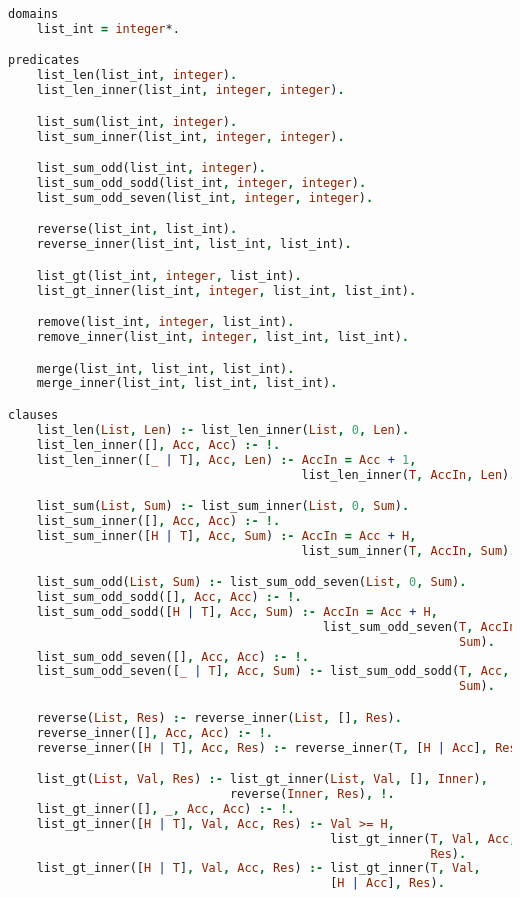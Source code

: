 \begin{lstlisting}[language=Prolog]
domains
    list_int = integer*.

predicates
    list_len(list_int, integer).
    list_len_inner(list_int, integer, integer).

    list_sum(list_int, integer).
    list_sum_inner(list_int, integer, integer).

    list_sum_odd(list_int, integer).
    list_sum_odd_sodd(list_int, integer, integer).
    list_sum_odd_seven(list_int, integer, integer).

    reverse(list_int, list_int).
    reverse_inner(list_int, list_int, list_int).

    list_gt(list_int, integer, list_int).
    list_gt_inner(list_int, integer, list_int, list_int).

    remove(list_int, integer, list_int).
    remove_inner(list_int, integer, list_int, list_int).

    merge(list_int, list_int, list_int).
    merge_inner(list_int, list_int, list_int).

clauses
    list_len(List, Len) :- list_len_inner(List, 0, Len).
    list_len_inner([], Acc, Acc) :- !.
    list_len_inner([_ | T], Acc, Len) :- AccIn = Acc + 1,
                                         list_len_inner(T, AccIn, Len).

    list_sum(List, Sum) :- list_sum_inner(List, 0, Sum).
    list_sum_inner([], Acc, Acc) :- !.
    list_sum_inner([H | T], Acc, Sum) :- AccIn = Acc + H,
                                         list_sum_inner(T, AccIn, Sum).

    list_sum_odd(List, Sum) :- list_sum_odd_seven(List, 0, Sum).
    list_sum_odd_sodd([], Acc, Acc) :- !.
    list_sum_odd_sodd([H | T], Acc, Sum) :- AccIn = Acc + H,
                                            list_sum_odd_seven(T, AccIn,
                                                               Sum).
    list_sum_odd_seven([], Acc, Acc) :- !.
    list_sum_odd_seven([_ | T], Acc, Sum) :- list_sum_odd_sodd(T, Acc,
                                                               Sum).

    reverse(List, Res) :- reverse_inner(List, [], Res).
    reverse_inner([], Acc, Acc) :- !.
    reverse_inner([H | T], Acc, Res) :- reverse_inner(T, [H | Acc], Res).

    list_gt(List, Val, Res) :- list_gt_inner(List, Val, [], Inner),
                               reverse(Inner, Res), !.
    list_gt_inner([], _, Acc, Acc) :- !.
    list_gt_inner([H | T], Val, Acc, Res) :- Val >= H,
                                             list_gt_inner(T, Val, Acc,
                                                           Res).
    list_gt_inner([H | T], Val, Acc, Res) :- list_gt_inner(T, Val,
                                             [H | Acc], Res).


\end{lstlisting}
